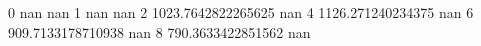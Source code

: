 0 nan nan
1 nan nan
2 1023.7642822265625 nan
4 1126.271240234375 nan
6 909.7133178710938 nan
8 790.3633422851562 nan
